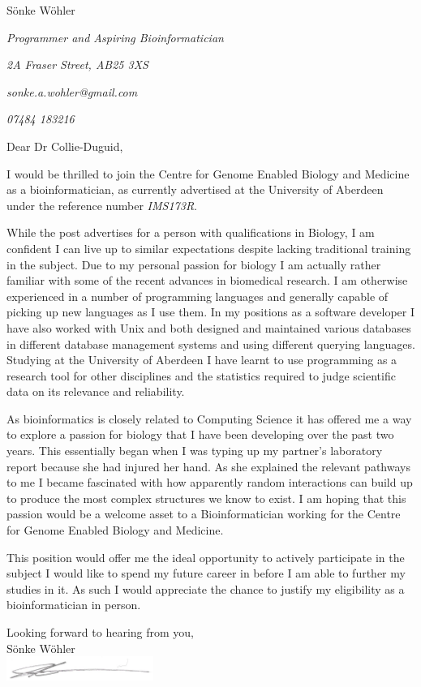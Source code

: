 \documentclass[paper=a4,fontsize=11pt]{scrartcl} %
\newcommand{\sepspace}{\vspace*{1em}}		%
\newcommand{\MyName}[1]{ %
  \Huge \usefont{OT1}{phv}{b}{n} \hfill #1
  \par \normalsize \normalfont}
\newcommand{\MySlogan}[4]{ %
  \large \usefont{OT1}{phv}{m}{n}\hfill \textit{#1} 
  \sepspace
  \par \normalsize \usefont{OT1}{phv}{m}{n}\hfill \textit{#2}
  \par \normalsize \usefont{OT1}{phv}{m}{n}\hfill \textit{#3}
  \par \normalsize \usefont{OT1}{phv}{m}{n}\hfill \textit{#4}
  \par \normalsize \normalfont}
\begin{document}
  
  \MyName{S\"onke W\"ohler}
  \MySlogan{Programmer and Aspiring Bioinformatician}{2A Fraser Street, AB25 3XS}{sonke.a.wohler@gmail.com}{07484 183216}
 \sepspace\sepspace
  
  \noindent
  Dear Dr Collie-Duguid,
    
  \sepspace
  
    \noindent
    I would be thrilled to join the Centre for Genome Enabled Biology and Medicine as a bioinformatician, as currently advertised at the University of Aberdeen under the reference number \textit{IMS173R}.
    \sepspace
    
    \noindent
    While the post advertises for a person with qualifications in Biology, I am confident I can live up to similar expectations despite lacking traditional training in the subject. Due to my personal passion for biology I am actually rather familiar with some of the recent advances in biomedical research. I am otherwise experienced in a number of programming languages and generally capable of picking up new languages as I use them. In my positions as a software developer I have also worked with Unix and both designed and maintained various databases in different database management systems and using different querying languages. Studying at the University of Aberdeen I have learnt to use programming as a research tool for other disciplines and the statistics required to judge scientific data on its relevance and reliability.
    \sepspace
    
    \noindent
    As bioinformatics is closely related to Computing Science it has offered me a way to explore a passion for biology that I have been developing over the past two years. This essentially began when I was typing up my partner's laboratory report because she had injured her hand. As she explained the relevant pathways to me I became fascinated with how apparently random interactions can build up to produce the most complex structures we know to exist. I am hoping that this passion would be a welcome asset to a Bioinformatician working for the Centre for Genome Enabled Biology and Medicine.
    \sepspace
    
    \noindent
    This position would offer me the ideal opportunity to actively participate in the subject I would like to spend my future career in before I am able to further my studies in it. As such I would appreciate the chance to justify my eligibility as a bioinformatician in person.
    \sepspace
    

  \sepspace
  
  \noindent
  Looking forward to hearing from you, \\
  S\"onke W\"ohler \\
 
  
  \includegraphics[height=0.78cm]{sonkiSignature}
  
\end{document}
